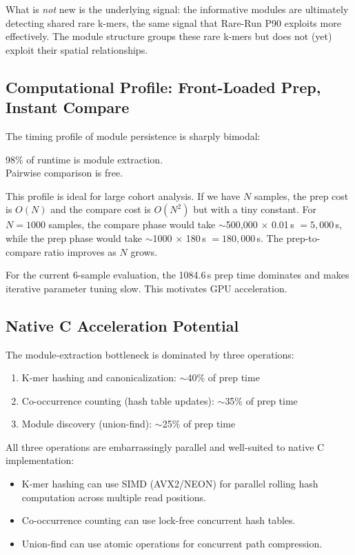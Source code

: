\documentclass{../yalumba}
\begin{document}
What is \emph{not} new is the underlying signal: the informative modules are
ultimately detecting shared rare k-mers, the same signal that Rare-Run P90
exploits more effectively.  The module structure groups these rare k-mers but
does not (yet) exploit their spatial relationships.

\subsection{Computational Profile: Front-Loaded Prep, Instant Compare}

The timing profile of module persistence is sharply bimodal:

\begin{pullquote}[dna-C]
98\% of runtime is module extraction.\\
Pairwise comparison is free.
\end{pullquote}

\noindent This profile is ideal for large cohort analysis.  If we have $N$
samples, the prep cost is $O(N)$ and the compare cost is $O(N^2)$ but with a
tiny constant.  For $N = 1000$ samples, the compare phase would take
$\sim$500{,}000 $\times$ 0.01\,s $= 5{,}000$\,s, while the prep phase would
take $\sim$1000 $\times$ 180\,s $= 180{,}000$\,s.  The prep-to-compare ratio
improves as $N$ grows.

For the current 6-sample evaluation, the 1084.6\,s prep time dominates and
makes iterative parameter tuning slow.  This motivates GPU acceleration.

\subsection{Native C Acceleration Potential}

The module-extraction bottleneck is dominated by three operations:

\begin{enumerate}
  \item K-mer hashing and canonicalization: $\sim$40\% of prep time
  \item Co-occurrence counting (hash table updates): $\sim$35\% of prep time
  \item Module discovery (union-find): $\sim$25\% of prep time
\end{enumerate}

All three operations are embarrassingly parallel and well-suited to native
C implementation:

\begin{itemize}
  \item K-mer hashing can use SIMD (AVX2/NEON) for parallel rolling hash
        computation across multiple read positions.
  \item Co-occurrence counting can use lock-free concurrent hash tables.
  \item Union-find can use atomic operations for concurrent path compression.
\end{itemize}
\end{document}
